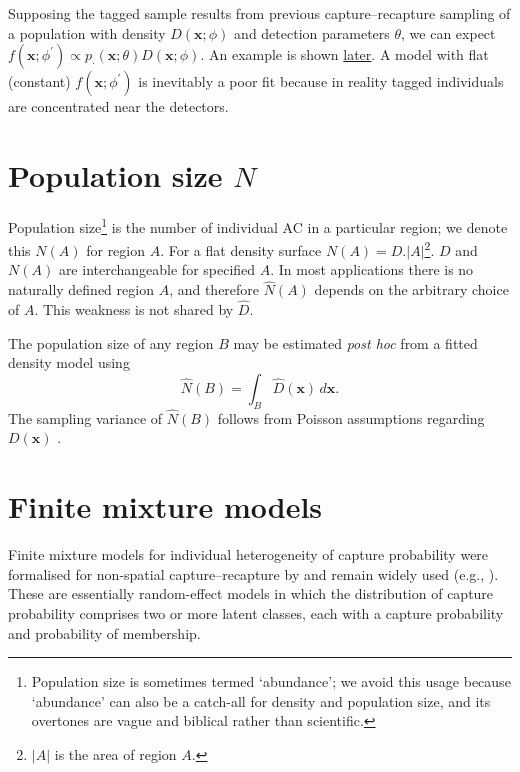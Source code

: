 \documentclass[
]{book}
\begin{document}
Supposing the tagged sample results from previous capture--recapture sampling of a population with density \(D(\mathbf{x}; \phi)\) and detection parameters \(\theta\), we can expect \(f(\mathbf{x}; \phi^\prime) \propto p_\cdot(\mathbf{x}; \theta) D(\mathbf{x}; \phi)\). An example is shown \hyperref[relativedensity2]{later}. A model with flat (constant) \(f(\mathbf{x}; \phi^\prime)\) is inevitably a poor fit because in reality tagged individuals are concentrated near the detectors.

\section{\texorpdfstring{Population size \(N\)}{Population size N}}\label{population-size-n}


Population size\footnote{Population size is sometimes termed `abundance'; we avoid this usage because `abundance' can also be a catch-all for density and population size, and its overtones are vague and biblical rather than scientific.} is the number of individual AC in a particular region; we denote this \(N(A)\) for region \(A\). For a flat density surface \(N(A) = D.|A|\)\footnote{\(|A|\) is the area of region \(A\).}. \(D\) and \(N(A)\) are interchangeable for specified \(A\). In most applications there is no naturally defined region \(A\), and therefore \(\hat N(A)\) depends on the arbitrary choice of \(A\). This weakness is not shared by \(\hat D\).

The population size of any region \(B\) may be estimated \emph{post hoc} from a fitted density model using
\[
\hat N(B) = \int_B \hat D(\mathbf{x}) \, d\mathbf{x}.
\]
The sampling variance of \(\hat N(B)\) follows from Poisson assumptions regarding \(D(\mathbf{x})\) \citep{ef13}.

\section{Finite mixture models}\label{finite-mixtures}


Finite mixture models for individual heterogeneity of capture probability were formalised for non-spatial capture--recapture by \citet{p2000} and remain widely used (e.g., \citet{cw}). These are essentially random-effect models in which the distribution of capture probability comprises two or more latent classes, each with a capture probability and probability of membership.
\end{document}
